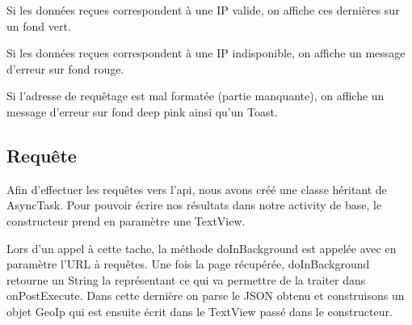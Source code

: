 \documentclass{report}
\begin{document}
			Si les données reçues correspondent à une IP valide, on affiche ces dernières sur un fond vert.
			
			Si les données reçues correspondent à une IP indisponible, on affiche un message d'erreur sur fond rouge.
	

			Si l'adresse de requêtage est mal formatée (partie manquante), on affiche un message d'erreur sur fond deep pink ainsi qu'un Toast.
			
			\subsection{Requête}
				Afin d'effectuer les requêtes vers l'api, nous avons créé une classe héritant de AsyncTask.
				Pour pouvoir écrire nos résultats dans notre activity de base, le constructeur prend en paramètre une TextView.
				
				Lors d'un appel à cette tache, la méthode doInBackground est appelée avec en paramètre l'URL à requêtes.
				Une fois la page récupérée, doInBackground retourne un String la représentant ce qui va permettre de la traiter dans onPostExecute.
				Dans cette dernière on parse le JSON obtenu et construisons un objet GeoIp qui est ensuite écrit dans le TextView passé dans le constructeur.
\end{document}
